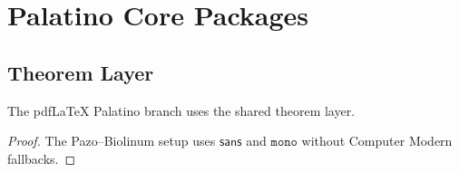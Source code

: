\documentclass{book}
\begin{document}
\chapter{Palatino Core Packages}
\section{Theorem Layer}
\begin{theorem}The pdfLaTeX Palatino branch uses the shared theorem layer.\end{theorem}
\begin{proof}The Pazo--Biolinum setup uses $\mathsf{sans}$ and $\mathtt{mono}$ without Computer Modern fallbacks.\end{proof}
\end{document}
